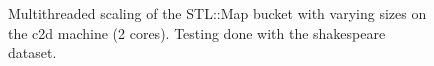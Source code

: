\begin{landscape}
\begin{figure}[!h]
{        }
        \label{fig:ts_c2d_shake_map}
        \caption{Multithreaded scaling of the STL::Map bucket with varying sizes on the
        c2d machine (2 cores). Testing done with the shakespeare dataset.}
    \end{figure}
    \begin{figure}[!h]
\end{figure}
\end{landscape}
